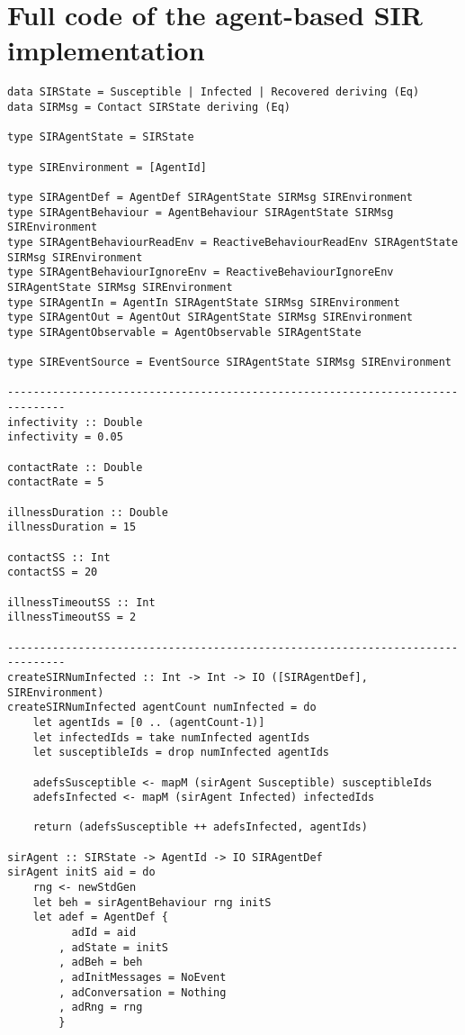 \section{Full code of the agent-based SIR implementation}
\label{app:abs_code}

\begin{verbatim}
data SIRState = Susceptible | Infected | Recovered deriving (Eq)
data SIRMsg = Contact SIRState deriving (Eq)

type SIRAgentState = SIRState

type SIREnvironment = [AgentId]

type SIRAgentDef = AgentDef SIRAgentState SIRMsg SIREnvironment
type SIRAgentBehaviour = AgentBehaviour SIRAgentState SIRMsg SIREnvironment
type SIRAgentBehaviourReadEnv = ReactiveBehaviourReadEnv SIRAgentState SIRMsg SIREnvironment
type SIRAgentBehaviourIgnoreEnv = ReactiveBehaviourIgnoreEnv SIRAgentState SIRMsg SIREnvironment
type SIRAgentIn = AgentIn SIRAgentState SIRMsg SIREnvironment
type SIRAgentOut = AgentOut SIRAgentState SIRMsg SIREnvironment
type SIRAgentObservable = AgentObservable SIRAgentState

type SIREventSource = EventSource SIRAgentState SIRMsg SIREnvironment

-------------------------------------------------------------------------------
infectivity :: Double
infectivity = 0.05

contactRate :: Double
contactRate = 5

illnessDuration :: Double
illnessDuration = 15

contactSS :: Int
contactSS = 20

illnessTimeoutSS :: Int
illnessTimeoutSS = 2

-------------------------------------------------------------------------------
createSIRNumInfected :: Int -> Int -> IO ([SIRAgentDef], SIREnvironment)
createSIRNumInfected agentCount numInfected = do
    let agentIds = [0 .. (agentCount-1)]
    let infectedIds = take numInfected agentIds
    let susceptibleIds = drop numInfected agentIds

    adefsSusceptible <- mapM (sirAgent Susceptible) susceptibleIds
    adefsInfected <- mapM (sirAgent Infected) infectedIds

    return (adefsSusceptible ++ adefsInfected, agentIds)

sirAgent :: SIRState -> AgentId -> IO SIRAgentDef
sirAgent initS aid = do
    rng <- newStdGen
    let beh = sirAgentBehaviour rng initS
    let adef = AgentDef { 
          adId = aid
        , adState = initS
        , adBeh = beh
        , adInitMessages = NoEvent
        , adConversation = Nothing
        , adRng = rng 
        }


\end{verbatim}
